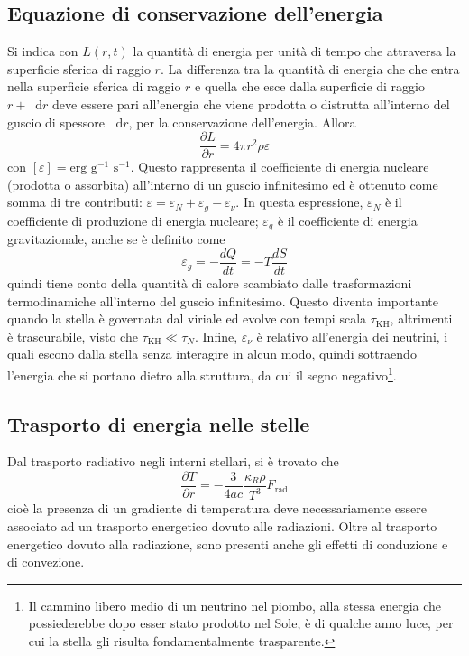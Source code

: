 \documentclass[11pt, a4paper]{scrartcl}
\theoremstyle{style}
\theoremstyle{style1}
\newcommand{\dd}{\mathop{}\!\mathrm{d}}
\numberwithin{equation}{subsection}
\begin{document}
\subsection{Equazione di conservazione dell'energia}

Si indica con $L(r,t)$ la quantit\`a di energia per unit\`a di tempo che attraversa la superficie sferica di raggio $r$.
La differenza tra la quantit\`a di energia che che entra nella superficie sferica di raggio $r$ e quella che esce dalla superficie di raggio $r+\dd r$ deve essere pari all'energia che viene prodotta o distrutta all'interno del guscio di spessore $\dd r$, per la conservazione dell'energia.
Allora
\[
\frac{\partial L}{\partial r}  = 4\pi r ^2 \rho  \varepsilon 
\] 
con $[\varepsilon ] = \text{erg g}^{-1}\text{ s}^{-1}$. 
Questo rappresenta il coefficiente di energia nucleare (prodotta o assorbita) all'interno di un guscio infinitesimo ed \`e ottenuto come somma di tre contributi: $\varepsilon = \varepsilon _N + \varepsilon _g - \varepsilon _\nu $.
In questa espressione, $\varepsilon _N$ \`e il coefficiente di produzione di energia nucleare; $\varepsilon _g$ \`e il coefficiente di energia gravitazionale, anche se \`e definito come 
\[
\varepsilon _g = - \frac{d Q}{d t} = - T \frac{d S}{d t} 
\] 
quindi tiene conto della quantit\`a di calore scambiato dalle trasformazioni termodinamiche all'interno del guscio infinitesimo.
Questo diventa importante quando la stella \`e governata dal viriale ed evolve con tempi scala $\tau _\text{KH}$, altrimenti \`e trascurabile, visto che $\tau _\text{KH}\ll\tau _N$.
Infine, $\varepsilon _\nu $ \`e relativo all'energia dei neutrini, i quali escono dalla stella senza interagire in alcun modo, quindi sottraendo l'energia che si portano dietro alla struttura, da cui il segno negativo\footnote{Il cammino libero medio di un neutrino nel piombo, alla stessa energia che possiederebbe dopo esser stato prodotto nel Sole, \`e di qualche anno luce, per cui la stella gli risulta fondamentalmente trasparente.}.
\subsection{Trasporto di energia nelle stelle}
Dal trasporto radiativo negli interni stellari, si \`e trovato che
\[
\frac{\partial T}{\partial r} = - \frac{3}{4a c} \frac{\kappa _R \rho }{T^3} F_\text{rad}
\] 
cio\`e la presenza di un gradiente di temperatura deve necessariamente essere associato ad un trasporto energetico dovuto alle radiazioni.
Oltre al trasporto energetico dovuto alla radiazione, sono presenti anche gli effetti di conduzione e di convezione.
\end{document}
